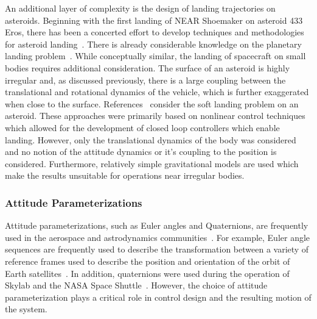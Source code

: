 An additional layer of complexity is the design of landing trajectories on asteroids.
Beginning with the first landing of NEAR Shoemaker on asteroid 433 Eros, there has been a concerted effort to develop techniques and methodologies for asteroid landing~\cite{dunham2002, kubota2006}.
There is already considerable knowledge on the planetary landing problem~\cite{acikmese2007, meditch1964, ingoldby1978}.
While conceptually similar, the landing of spacecraft on small bodies requires additional consideration. 
The surface of an asteroid is highly irregular and, as discussed previously, there is a large coupling between the translational and rotational dynamics of the vehicle, which is further exaggerated when close to the surface.
References~\textcite{guelman1994, furfaro2013, zexu2012} consider the soft landing problem on an asteroid.
These approaches were primarily based on nonlinear control techniques which allowed for the development of closed loop controllers which enable landing.
However, only the translational dynamics of the body was considered and no notion of the attitude dynamics or it's coupling to the position is considered.
Furthermore, relatively simple gravitational models are used which make the results unsuitable for operations near irregular bodies.

\subsubsection{Attitude Parameterizations}\label{ssec:attitude_parameterization}

Attitude parameterizations, such as Euler angles and Quaternions, are frequently used in the aerospace and astrodynamics communities~\cite{vallado2007}.
For example, Euler angle sequences are frequently used to describe the transformation between a variety of reference frames used to describe the position and orientation of the orbit of Earth satellites~\cite{vallado2007}.
In addition, quaternions were used during the operation of Skylab and the NASA Space Shuttle~\cite{hughes2004}.
However, the choice of attitude parameterization plays a critical role in control design and the resulting motion of the system.

